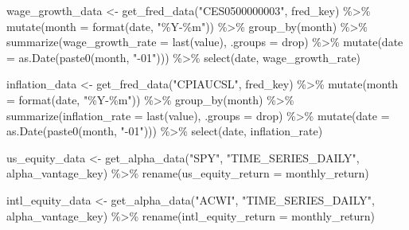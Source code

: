 \documentclass[
  letterpaper,
  DIV=11,
  numbers=noendperiod]{scrartcl}
\newenvironment{Shaded}{\begin{snugshade}}{\end{snugshade}}
\newcommand{\AttributeTok}[1]{\textcolor[rgb]{0.40,0.45,0.13}{#1}}
\newcommand{\FunctionTok}[1]{\textcolor[rgb]{0.28,0.35,0.67}{#1}}
\newcommand{\NormalTok}[1]{\textcolor[rgb]{0.00,0.23,0.31}{#1}}
\newcommand{\OtherTok}[1]{\textcolor[rgb]{0.00,0.23,0.31}{#1}}
\newcommand{\SpecialCharTok}[1]{\textcolor[rgb]{0.37,0.37,0.37}{#1}}
\newcommand{\StringTok}[1]{\textcolor[rgb]{0.13,0.47,0.30}{#1}}
\begin{document}
\begin{Shaded}
\begin{Highlighting}[]
\NormalTok{wage\_growth\_data }\OtherTok{\textless{}{-}} \FunctionTok{get\_fred\_data}\NormalTok{(}\StringTok{"CES0500000003"}\NormalTok{, fred\_key) }\SpecialCharTok{\%\textgreater{}\%}
  \FunctionTok{mutate}\NormalTok{(}\AttributeTok{month =} \FunctionTok{format}\NormalTok{(date, }\StringTok{"\%Y{-}\%m"}\NormalTok{)) }\SpecialCharTok{\%\textgreater{}\%}
  \FunctionTok{group\_by}\NormalTok{(month) }\SpecialCharTok{\%\textgreater{}\%}
  \FunctionTok{summarize}\NormalTok{(}\AttributeTok{wage\_growth\_rate =} \FunctionTok{last}\NormalTok{(value), }\AttributeTok{.groups =} \StringTok{\textquotesingle{}drop\textquotesingle{}}\NormalTok{) }\SpecialCharTok{\%\textgreater{}\%}
  \FunctionTok{mutate}\NormalTok{(}\AttributeTok{date =} \FunctionTok{as.Date}\NormalTok{(}\FunctionTok{paste0}\NormalTok{(month, }\StringTok{"{-}01"}\NormalTok{))) }\SpecialCharTok{\%\textgreater{}\%}
  \FunctionTok{select}\NormalTok{(date, wage\_growth\_rate)}

\NormalTok{inflation\_data }\OtherTok{\textless{}{-}} \FunctionTok{get\_fred\_data}\NormalTok{(}\StringTok{"CPIAUCSL"}\NormalTok{, fred\_key) }\SpecialCharTok{\%\textgreater{}\%}
  \FunctionTok{mutate}\NormalTok{(}\AttributeTok{month =} \FunctionTok{format}\NormalTok{(date, }\StringTok{"\%Y{-}\%m"}\NormalTok{)) }\SpecialCharTok{\%\textgreater{}\%}
  \FunctionTok{group\_by}\NormalTok{(month) }\SpecialCharTok{\%\textgreater{}\%}
  \FunctionTok{summarize}\NormalTok{(}\AttributeTok{inflation\_rate =} \FunctionTok{last}\NormalTok{(value), }\AttributeTok{.groups =} \StringTok{\textquotesingle{}drop\textquotesingle{}}\NormalTok{) }\SpecialCharTok{\%\textgreater{}\%}
  \FunctionTok{mutate}\NormalTok{(}\AttributeTok{date =} \FunctionTok{as.Date}\NormalTok{(}\FunctionTok{paste0}\NormalTok{(month, }\StringTok{"{-}01"}\NormalTok{))) }\SpecialCharTok{\%\textgreater{}\%}
  \FunctionTok{select}\NormalTok{(date, inflation\_rate)}

\NormalTok{us\_equity\_data }\OtherTok{\textless{}{-}} \FunctionTok{get\_alpha\_data}\NormalTok{(}\StringTok{"SPY"}\NormalTok{, }\StringTok{"TIME\_SERIES\_DAILY"}\NormalTok{, alpha\_vantage\_key) }\SpecialCharTok{\%\textgreater{}\%}
  \FunctionTok{rename}\NormalTok{(}\AttributeTok{us\_equity\_return =}\NormalTok{ monthly\_return)}

\NormalTok{intl\_equity\_data }\OtherTok{\textless{}{-}} \FunctionTok{get\_alpha\_data}\NormalTok{(}\StringTok{"ACWI"}\NormalTok{, }\StringTok{"TIME\_SERIES\_DAILY"}\NormalTok{, alpha\_vantage\_key) }\SpecialCharTok{\%\textgreater{}\%}
  \FunctionTok{rename}\NormalTok{(}\AttributeTok{intl\_equity\_return =}\NormalTok{ monthly\_return)}


\end{Highlighting}
\end{Shaded}
\end{document}

